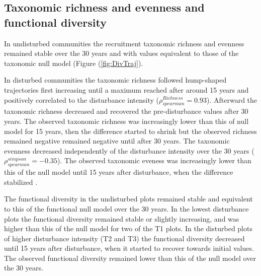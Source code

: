 \documentclass[fleqn,10pt]{ArtEcoFoG} %
\begin{document}
\subsection{Taxonomic richness and evenness and functional
diversity}\label{taxonomic-richness-and-evenness-and-functional-diversity}

In undisturbed communities the recruitment taxonomic richness and
evenness remained stable over the 30 years and with values equivalent to
those of the taxonomic null model (Figure (\ref{fig:DivTraj}).

In disturbed communities the taxonomic richness followed hump-shaped
trajectories first increasing until a maximum reached after around 15
years and positively correlated to the disturbance intensity
(\(\rho^{Richness}_{spearman}=0.93\)). Afterward the taxonomic richness
decreased and recovered the pre-disturbance values after 30 years. The
observed taxonomic richness was increasingly lower than this of null
model for 15 years, then the difference started to shrink but the
observed richness remained negative remained negative until after 30
years. The taxonomic evenness decreased independently of the disturbance
intensity over the 30 years (\(\rho^{simpson}_{spearman}=-0.35\)). The
observed taxonomic eveness was increasingly lower than this of the null
model until 15 years after disturbance, when the difference stabilized .

The functional diversity in the undisturbed plots remained stable and
equivalent to this of the functional null model over the 30 years. In
the lowest disturbance plots the functional diversity remained stable or
slightly increasing, and was higher than this of the null model for two
of the T1 plots. In the disturbed plots of higher disturbance intensity
(T2 and T3) the functional diversity decreased until 15 years after
disturbance, when it started to recover towards initial values. The
observed functional diversity remained lower than this of the null model
over the 30 years.
\end{document}

